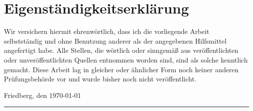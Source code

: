 \documentclass[
	ngerman,
	parskip=half,
	headsepline,
	fontsize=12pt,
	DIV=13,
	listof=leveldown,
	]{scrreprt}
\begin{document}
	\chapter{Eigenständigkeitserklärung}
	
	Wir versichern hiermit ehrenwörtlich, dass ich die vorliegende Arbeit selbstständig und ohne Benutzung anderer als der angegebenen Hilfsmittel angefertigt habe. Alle Stellen, die wörtlich oder sinngemäß aus veröffentlichten oder unveröffentlichten Quellen entnommen worden sind, sind als solche kenntlich gemacht. Diese Arbeit lag in gleicher oder ähnlicher Form noch keiner anderen Prüfungsbehörde vor und wurde bisher noch nicht veröffentlicht.
	
	Friedberg, den \today
	
	
	\rule[-0.2cm]{5cm}{0.5pt}
	
	\textsc{\theauthor} 

	
	
	
	\printbibliography
\end{document}
